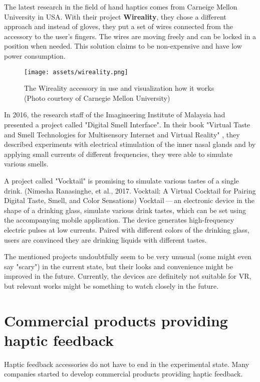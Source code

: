 The latest research in the field of hand haptics comes from Carneige Mellon
University in USA. With their project \textbf{Wireality}, they chose a different
approach and instead of gloves, they put a set of wires connected from the
accessory to the user’s fingers. The wires are moving freely and can be locked
in a position when needed. This solution claims to be non-expensive and
have low power consumption. \cite{wireality}


\begin{figure}[h]{}
\centering\texttt{[image: assets/wireality.png]}
\caption{The Wireality accessory in use and visualization how it works (Photo courtesy of Carnegie Mellon University)}
\end{figure}

In 2016, the research staff of the Imagineering Institute of Malaysia
had presented a project called "Digital Smell Interface". In their book
"Virtual Taste and Smell Technologies for Multisensory Internet and Virtual
Reality" \cite{vrstmivr}, they described experiments with electrical stimulation
of the inner nasal glands and by applying small currents of different
frequencies, they were able to simulate various smells.


A project called "Vocktail" is promising to simulate various tastes of a single
drink.
(Nimesha Ranasinghe, et al., 2017. Vocktail: A Virtual Cocktail for Pairing
Digital Taste, Smell, and Color Sensations) \cite{vocktail} Vocktail — an electronic
device in the shape of a drinking glass, simulate various drink tastes,
which can be set using the accompanying mobile application. The device
generates high-frequency electric pulses at low currents. Paired with
different colors of the drinking glass, users are convinced they are drinking
liquids with different tastes.


The mentioned projects undoubtfully seem to be very unusual
(some might even say "scary") in the current state, but their looks and convenience
might be improved in the future. Currently, the devices are definitely not
suitable for VR, but relevant works might be something to
watch closely in the future.


\hypertarget{x-commercial-products-providing-haptic-feedback}{\section{Commercial products providing haptic feedback}}
Haptic feedback accessories do not have to end in the experimental state.
Many companies started to develop commercial products providing haptic feedback.


